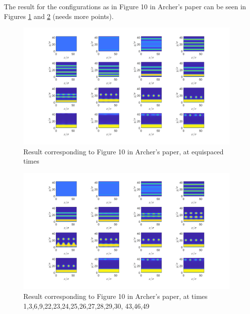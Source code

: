 \documentclass[11pt, a4paper]{article}
\theoremstyle{definition}
\begin{document}
The result for the configurations as in Figure 10 in Archer's paper can be seen in Figures \ref{F4ab} and \ref{F4b} (needs more points).
\begin{figure}[h]
	\centering
	\includegraphics[scale=0.25]{Pretty3.png}
	\caption{Result corresponding to Figure 10 in Archer's paper, at equispaced times} 
	\label{F4ab}
\end{figure}

\begin{figure}[h]
	\centering
	\includegraphics[scale=0.25]{Pretty2.png}
	\caption{Result corresponding to Figure 10 in Archer's paper, at times 1,3,6,9,22,23,24,25,26,27,28,29,30, 43,46,49} 
	\label{F4b}
\end{figure}
\end{document}
